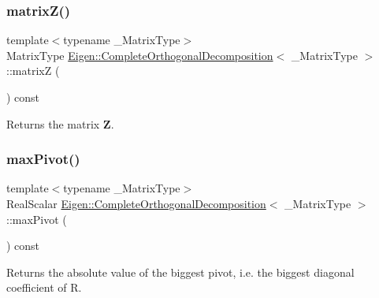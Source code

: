 \subsubsection{\texorpdfstring{matrixZ()}{matrixZ()}}
{\footnotesize\ttfamily template$<$typename \+\_\+\+Matrix\+Type$>$ \\
Matrix\+Type \mbox{\hyperlink{class_eigen_1_1_complete_orthogonal_decomposition}{Eigen\+::\+Complete\+Orthogonal\+Decomposition}}$<$ \+\_\+\+Matrix\+Type $>$\+::matrixZ (\begin{DoxyParamCaption}{ }\end{DoxyParamCaption}) const\hspace{0.3cm}{\ttfamily [inline]}}

\begin{DoxyReturn}{Returns}
the matrix {\bfseries{Z}}. 
\end{DoxyReturn}
\mbox{\label{class_eigen_1_1_complete_orthogonal_decomposition_a5b712a58c13b7e5089be9228ec42f738}} 
\subsubsection{\texorpdfstring{maxPivot()}{maxPivot()}}
{\footnotesize\ttfamily template$<$typename \+\_\+\+Matrix\+Type$>$ \\
Real\+Scalar \mbox{\hyperlink{class_eigen_1_1_complete_orthogonal_decomposition}{Eigen\+::\+Complete\+Orthogonal\+Decomposition}}$<$ \+\_\+\+Matrix\+Type $>$\+::max\+Pivot (\begin{DoxyParamCaption}{ }\end{DoxyParamCaption}) const\hspace{0.3cm}{\ttfamily [inline]}}

\begin{DoxyReturn}{Returns}
the absolute value of the biggest pivot, i.\+e. the biggest diagonal coefficient of R. 
\end{DoxyReturn}
\mbox{\label{class_eigen_1_1_complete_orthogonal_decomposition_af9d7a5bdbc16a4a0bf7394ef0dd208da}} 
